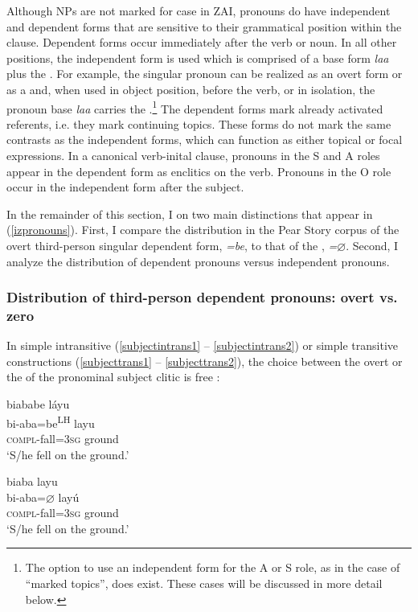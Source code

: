 Although NPs are not marked for case in ZAI, pronouns do have independent and dependent forms that are sensitive to their grammatical position within the clause. Dependent forms occur immediately after the verb or noun. In all other positions, the independent form is used which is comprised of a base form \textit{laa} plus the . For example, the  singular pronoun can be realized as an overt form or as a  and, when used in object position, before the verb, or in isolation, the pronoun base \textit{laa} carries the .\footnote{The option to use an independent form for the A or S role, as in the case of ``marked topics'', does exist. These cases will be discussed in more detail below.} The dependent forms mark already activated referents, i.e. they mark continuing topics. These forms do not mark the same contrasts as the independent forms, which can function as either topical or focal expressions. In a canonical verb-inital clause, pronouns in the S and A roles appear in the dependent form as enclitics on the verb. Pronouns in the O role occur in the independent form after the subject.

In the remainder of this section, I  on two main distinctions that appear  in (\ref{izpronouns}). First, I compare the distribution in the Pear Story corpus of the overt third-person singular dependent form, \textit{=be}, to that of the , \textit{=$\varnothing$}. Second, I analyze the distribution of dependent pronouns versus independent pronouns. 


\subsubsection{Distribution of third-person dependent pronouns: overt vs. zero}

In simple intransitive (\ref{subjectintrans1} -- \ref{subjectintrans2}) or simple transitive constructions (\ref{subjecttrans1} -- \ref{subjecttrans2}), the choice between the overt or the  of the pronominal subject clitic is free \citep{marlett1996}:

\ea\label{subjectintrans1}
\glll biababe l\'{a}yu \\
bi-aba=be\textsuperscript{LH} layu \\
\textsc{compl}-fall=3\textsc{sg} ground \\
\glt `S/he fell on the ground.'
\z

\ea\label{subjectintrans2}
\glll biaba layu \\
bi-aba=$\varnothing$ lay\'{u} \\
\textsc{compl}-fall=3\textsc{sg} ground \\
\glt `S/he fell on the ground.'
\z

